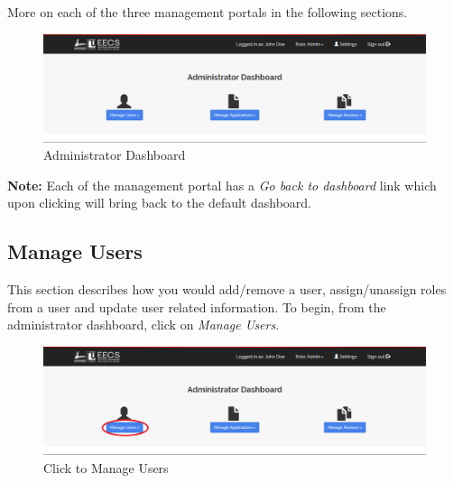 \documentclass[fontsize=12pt,paper=letter,twoside]{scrartcl}
\begin{document}
\smallskip
\noindent More on each of the three management portals in the following sections.

\begin{figure}[!htb]
\begin{center}
\includegraphics[width=.99\textwidth]{images/adm/admin_dash.png}
\end{center}
\caption{Administrator Dashboard}
\label{fig:adm/admin_dash}
\end{figure}

\smallskip
\noindent \textbf{Note:} Each of the management portal has a \emph{Go back to dashboard} link which upon clicking will bring back to the default dashboard.


\newpage
\clearpage
\subsection{Manage Users} \label{m_user}
This section describes how you would add/remove a user, assign/unassign roles from a user and update user related information. To begin, from the administrator dashboard, click on \emph{Manage Users}.

\begin{figure}[!htb]
\begin{center}
\includegraphics[width=.99\textwidth]{images/adm/mu/manage_user.png}
\end{center}
\caption{Click to Manage Users}
\label{fig:adm/manage_user}
\end{figure}
\end{document}

